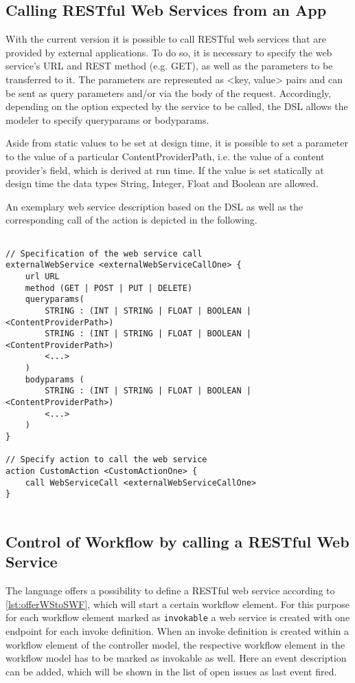 
\subsection{Calling RESTful Web Services from an App}
\label{subsec: CallingWebServices}
With the current \MD version it is possible to call RESTful web services that are provided by external applications. To do so, it is necessary to specify the web service's URL and REST method (e.g. GET), as well as the parameters to be transferred to it. The parameters are represented as <key, value> pairs and can be sent as query parameters and/or via the body of the request. Accordingly, depending on the option expected by the service to be called, the DSL allows the modeler to specify queryparams or bodyparams. 

Aside from static values to be set at design time, it is possible to set a parameter to the value of a particular ContentProviderPath, i.e. the value of a content provider's field, which is derived at run time. If the value is set statically at design time the data types String, Integer, Float and Boolean are allowed. 

An exemplary web service description based on the DSL as well as the corresponding call of the action is depicted in the following.

\begin{lstlisting}[language=MD2, label=lst:callWSfromWF, caption=Calling a web service from within a workflow]

// Specification of the web service call
externalWebService <externalWebServiceCallOne> {
	url URL
	method (GET | POST | PUT | DELETE)
	queryparams(
		STRING : (INT | STRING | FLOAT | BOOLEAN | <ContentProviderPath>)	
		STRING : (INT | STRING | FLOAT | BOOLEAN | <ContentProviderPath>)
		<...>	
	)
	bodyparams (
		STRING : (INT | STRING | FLOAT | BOOLEAN | <ContentProviderPath>)
		<...>
	)
}

// Specify action to call the web service
action CustomAction <CustomActionOne> {
	call WebServiceCall <externalWebServiceCallOne>
}
	
\end{lstlisting}





\subsection{Control of Workflow by calling a RESTful Web Service}
\label{subsec: WorkflowControlThroughWS}
The \MD language offers a possibility to define a RESTful web service according to \cref{lst:offerWStoSWF}, which will start a certain workflow element. For this purpose for each workflow element marked as \lstinline|invokable| a web service is created with one endpoint for each invoke definition. 
When an invoke definition is created within a workflow element of the controller model, the respective workflow element in the workflow model has to be marked as invokable as well. Here an event description can be added, which will be shown in the list of open issues as last event fired.

